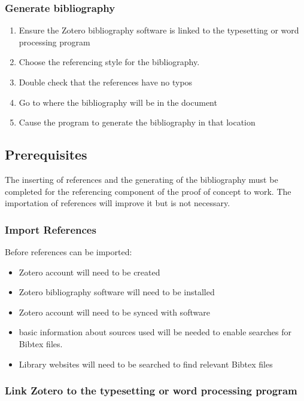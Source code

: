 \documentclass{article}
\begin{document}
\subsubsection*{Generate bibliography}
\begin{enumerate} 
\item Ensure the Zotero bibliography software is linked to the typesetting or word processing program
\item Choose the referencing style for the bibliography.
\item Double check that the references have no typos
\item Go to where the bibliography will be in the document
\item Cause the program to generate the bibliography in that location
\end{enumerate} 


\subsection*{Prerequisites}

The inserting of references and the generating of the bibliography must be completed for the referencing component of the proof of concept to work. The importation of references will improve it but is not necessary.

\subsubsection*{Import References}

Before references can be imported:
\begin{itemize}
\item Zotero account will need to be created
    \item Zotero bibliography software will need to be installed
    \item Zotero account will need to be synced with software
    \item basic information about sources used will be needed to enable searches for Bibtex files.
    \item Library websites will need to be searched to find relevant Bibtex files
\end{itemize}

\subsubsection*{Link Zotero to the typesetting or word processing program}
\end{document}
